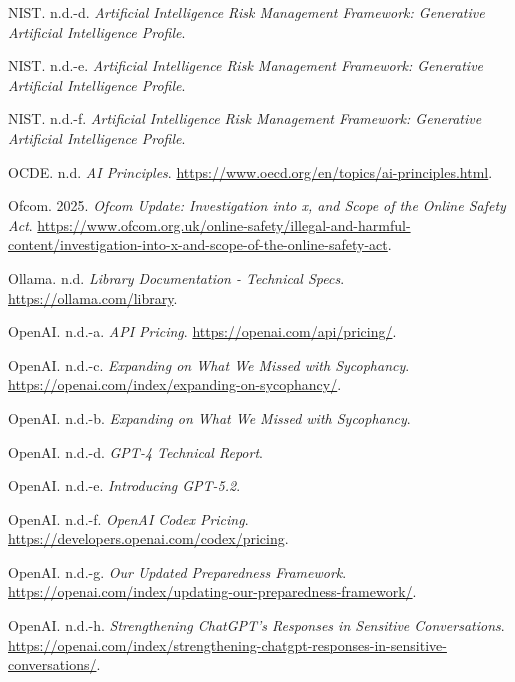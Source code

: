 \documentclass[
  10pt,
  a4paper,
  DIV=11,
  numbers=noendperiod,
  oneside]{scrreprt}
\newlength{\cslhangindent}
\newenvironment{CSLReferences}[2] %
 {\begin{list}{}{%
  \setlength{\itemindent}{0pt}
  \setlength{\leftmargin}{0pt}
  \setlength{\parsep}{0pt}
  \ifodd #1
   \setlength{\leftmargin}{\cslhangindent}
   \setlength{\itemindent}{-1\cslhangindent}
  \fi
  \setlength{\itemsep}{#2\baselineskip}}}
 {\end{list}}
\let\oldemph\emph
\renewcommand{\emph}[1]{\oldemph{\textcolor{cmmgray}{#1}}}
\begin{document}
\begin{CSLReferences}{1}{1}
NIST. n.d.-d. \emph{Artificial Intelligence Risk Management Framework:
Generative Artificial Intelligence Profile}.

NIST. n.d.-e. \emph{Artificial Intelligence Risk Management Framework:
Generative Artificial Intelligence Profile}.

NIST. n.d.-f. \emph{Artificial Intelligence Risk Management Framework:
Generative Artificial Intelligence Profile}.

OCDE. n.d. \emph{AI Principles}.
\url{https://www.oecd.org/en/topics/ai-principles.html}.

Ofcom. 2025. \emph{Ofcom Update: Investigation into x, and Scope of the
Online Safety Act}.
\url{https://www.ofcom.org.uk/online-safety/illegal-and-harmful-content/investigation-into-x-and-scope-of-the-online-safety-act}.

Ollama. n.d. \emph{Library Documentation - Technical Specs}.
\url{https://ollama.com/library}.

OpenAI. n.d.-a. \emph{API Pricing}.
\url{https://openai.com/api/pricing/}.

OpenAI. n.d.-c. \emph{Expanding on What We Missed with Sycophancy}.
\url{https://openai.com/index/expanding-on-sycophancy/}.

OpenAI. n.d.-b. \emph{Expanding on What We Missed with Sycophancy}.

OpenAI. n.d.-d. \emph{GPT-4 Technical Report}.

OpenAI. n.d.-e. \emph{Introducing GPT-5.2}.

OpenAI. n.d.-f. \emph{OpenAI Codex Pricing}.
\url{https://developers.openai.com/codex/pricing}.

OpenAI. n.d.-g. \emph{Our Updated Preparedness Framework}.
\url{https://openai.com/index/updating-our-preparedness-framework/}.

OpenAI. n.d.-h. \emph{Strengthening ChatGPT's Responses in Sensitive
Conversations}.
\url{https://openai.com/index/strengthening-chatgpt-responses-in-sensitive-conversations/}.


\end{CSLReferences}
\end{document}

